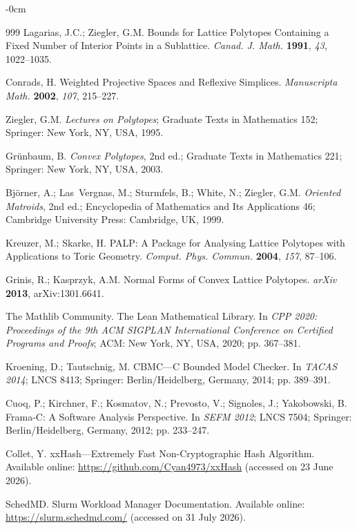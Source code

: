 \documentclass[appliedmath,article,submit,moreauthors]{Definitions/mdpi}
\begin{document}
\begin{adjustwidth}{-\extralength}{0cm}
\begin{thebibliography}{999}
Lagarias, J.C.; Ziegler, G.M.
Bounds for Lattice Polytopes Containing a Fixed Number of Interior Points in a Sublattice.
\textit{Canad. J. Math.} \textbf{1991}, \textit{43}, 1022--1035.

Conrads, H.
Weighted Projective Spaces and Reflexive Simplices.
\textit{Manuscripta Math.} \textbf{2002}, \textit{107}, 215--227.

Ziegler, G.M.
\textit{Lectures on Polytopes}; Graduate Texts in Mathematics 152;
Springer: New York, NY, USA, 1995.

Gr{\"u}nbaum, B.
\textit{Convex Polytopes}, 2nd ed.; Graduate Texts in Mathematics 221;
Springer: New York, NY, USA, 2003.

Bj{\"o}rner, A.; Las~Vergnas, M.; Sturmfels, B.; White, N.; Ziegler, G.M.
\textit{Oriented Matroids}, 2nd ed.; Encyclopedia of Mathematics and Its Applications 46;
Cambridge University Press: Cambridge, UK, 1999.

Kreuzer, M.; Skarke, H.
PALP: A Package for Analysing Lattice Polytopes with Applications to Toric Geometry.
\textit{Comput. Phys. Commun.} \textbf{2004}, \textit{157}, 87--106.

{\color{blue}
Grinis, R.; Kasprzyk, A.M.
Normal Forms of Convex Lattice Polytopes.
\textit{arXiv} \textbf{2013}, arXiv:1301.6641.
}

The Mathlib Community.
The Lean Mathematical Library.
In
\textit{CPP 2020: Proceedings of the 9th ACM SIGPLAN International Conference on Certified Programs and Proofs};
ACM: New York, NY, USA, 2020; pp. 367--381.

Kroening, D.; Tautschnig, M.
CBMC---C Bounded Model Checker.
In \textit{TACAS 2014};
LNCS 8413; Springer: Berlin/Heidelberg, Germany, 2014; pp. 389--391.

Cuoq, P.; Kirchner, F.; Kosmatov, N.; Prevosto, V.; Signoles, J.; Yakobowski, B.
Frama-C: A Software Analysis Perspective.
In \textit{SEFM 2012};
LNCS 7504; Springer: Berlin/Heidelberg, Germany, 2012; pp. 233--247.

Collet, Y.
xxHash---Extremely Fast Non-Cryptographic Hash Algorithm.
Available online: \url{https://github.com/Cyan4973/xxHash}
(accessed on 23 June 2026).

SchedMD.
Slurm Workload Manager Documentation.
Available online: \url{https://slurm.schedmd.com/}
(accessed on 31 July 2026).


\end{thebibliography}
\end{adjustwidth}
\end{document}
